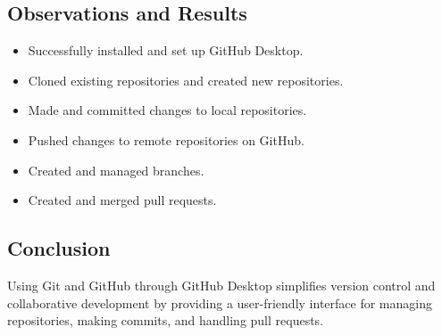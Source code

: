 \subsection{Observations and Results}

\begin{itemize}
    \item Successfully installed and set up GitHub Desktop.
    \item Cloned existing repositories and created new repositories.
    \item Made and committed changes to local repositories.
    \item Pushed changes to remote repositories on GitHub.
    \item Created and managed branches.
    \item Created and merged pull requests.
\end{itemize}

\subsection{Conclusion}

Using Git and GitHub through GitHub Desktop simplifies version control and collaborative development by providing a user-friendly interface for managing repositories, making commits, and handling pull requests.
